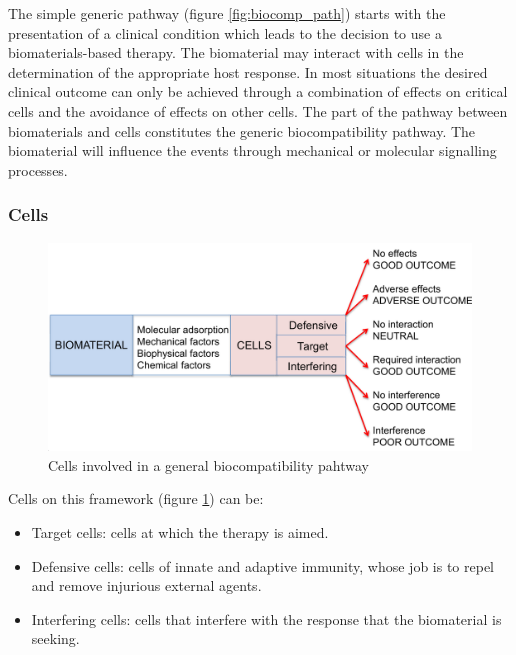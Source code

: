 	The simple generic pathway (figure \ref{fig:biocomp_path}) starts with the presentation of a clinical condition which leads to the decision to use a biomaterials-based therapy.
	The biomaterial may interact with cells in the determination of the appropriate host response.
	In most situations the desired clinical outcome can only be achieved through a combination of effects on critical cells and the avoidance of effects on other cells.
	The part of the pathway between biomaterials and cells constitutes the generic biocompatibility pathway.
	The biomaterial will influence the events through mechanical or molecular signalling processes.

		\subsubsection{Cells}

		\begin{figure}[ht]
			\includegraphics[width=\textwidth]{biocomp_cells.png}
			\caption{Cells involved in a general biocompatibility pahtway}
			\label{fig:biocomp_cells}
		\end{figure}

		Cells on this framework (figure \ref{fig:biocomp_cells}) can be:

		\begin{multicols}{2}
			\begin{itemize}
				\item Target cells: cells at which the therapy is aimed.
				\item Defensive cells: cells of innate and adaptive immunity, whose job is to repel and remove injurious external agents.
				\item Interfering cells: cells that interfere with the response that the biomaterial is seeking.
			\end{itemize}
		\end{multicols}

